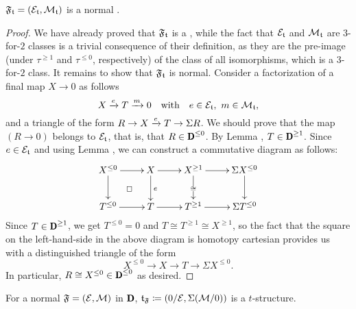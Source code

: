 \begin{lemma}
$\mathfrak{F}_{\mathfrak{t}}=(\mathcal{E}_{\mathfrak{t}},\mathcal{M}_{\mathfrak{t}})$ is a normal \htth.
\end{lemma}
\begin{proof}
We have already proved that $\mathfrak{F}_{\mathfrak{t}}$ is a \hfs, while the fact that $\mathcal{E}_{\mathfrak{t}}$  and $\mathcal{M}_{\mathfrak{t}}$ are $3$-for-$2$ classes is a trivial consequence of their definition, as they are the pre-image (under $\tau^{\geq1}$ and $\tau^{\leq0}$, respectively) of the class of all isomorphisms, which is a $3$-for-$2$ class. It remains to show that $\mathfrak{F}_{\mathfrak{t}}$ is normal. Consider a factorization of a final map $X\to 0$ as follows
\[
X \xrightarrow{e} T \xrightarrow{m}  0\ \ \text{ with }\ \ e\in \mathcal{E}_{\mathfrak{t}},\ m\in \mathcal{M}_{\mathfrak{t}},
\] 
and a triangle of the form $R\to X \xrightarrow{e} T\to \Sigma R$. We should prove that the map $(R\to 0)$ belongs to $\mathcal{E}_{\mathfrak{t}}$, that is, that $R\in  \cD^{\leq 0} $. By Lemma , $T\in  \cD^{\geq 1} $. Since $e\in \mathcal{E}_{\mathfrak{t}}$ and using Lemma , we can construct a commutative diagram as follows:
\[
\xymatrix{
X^{\leq0}\ar@{}[dr]|\square\ar[r]\ar[d]&X\ar[r]\ar[d]^{e}&X^{\geq1}\ar[r]\ar[d]|\cong&\Sigma X^{\leq0}\ar[d]\\
T^{\leq0}\ar[r]&T\ar[r]&T^{\geq1}\ar[r]&\Sigma T^{\leq0}}
\]
Since $T\in  \cD^{\geq 1} $, we get $T^{\leq0}=0$ and $T\cong T^{\geq 1}\cong X^{\geq1}$, so the fact that the square on the left-hand-side in the above diagram is homotopy cartesian provides us with a distinguished triangle of the form
\[
X^{\leq0}\to X\to T\to \Sigma X^{\leq0}.
\]
In particular, $R\cong X^{\leq0}\in  \cD^{\leq 0} $ as desired.
\end{proof}
\begin{lemma}\label{htt_induces_t_structure}
For a normal \htth $\mathfrak{F}=(\mathcal{E},\mathcal{M})$ in $\cD$, $\mathfrak{t}_{\mathfrak{F}} \coloneqq (0/\mathcal{E},\Sigma(\mathcal{M}/0))$ is a $t$-structure.
\end{lemma}
